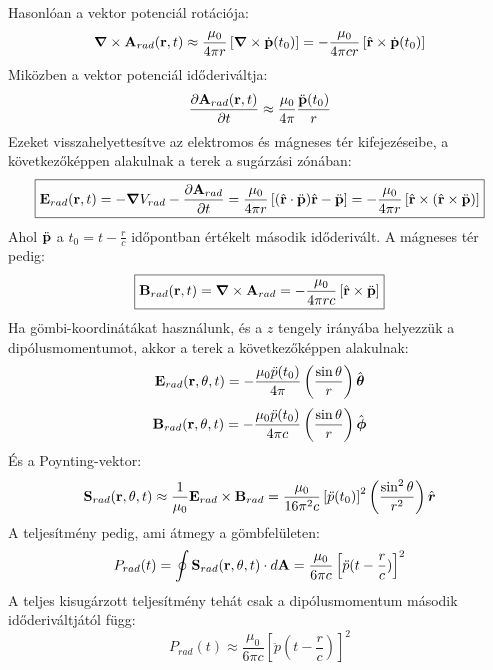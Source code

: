 \documentclass[a4paper,12pt]{article}
\begin{document}
Hasonlóan a vektor potenciál rotációja:
\begin{equation}
    \boldsymbol{\nabla} \times \bold{A}_{rad}(\bold{r}, t) \approx \frac{\mu_0}{4 \pi r} \left[\boldsymbol{\nabla} \times \dot{\bold{p}}(t_0) \right] = - \frac{\mu_0}{4 \pi c r} \left[\hat{\bold{r}} \times\dot{\bold{p}}(t_0) \right]
\end{equation}
Miközben a vektor potenciál időderiváltja:
\begin{equation}
    \frac{\partial \bold{A}_{rad}(\bold{r}, t)}{\partial t} \approx \frac{\mu_0}{4 \pi} \frac{\ddot{\bold{p}}(t_0)}{r}
\end{equation}
Ezeket visszahelyettesítve az elektromos és mágneses tér kifejezéseibe, a következőképpen alakulnak a terek a sugárzási zónában:
\begin{equation}
    \boxed{\bold{E}_{rad}(\bold{r}, t) = - \boldsymbol{\nabla} V_{rad} - \frac{\partial \bold{A}_{rad}}{\partial t} = \frac{\mu_0}{4 \pi r} \left[(\hat{\bold{r}} \cdot \ddot{\bold{p}})\hat{\bold{r}} - \ddot{\bold{p}}\right] = - \frac{\mu_0}{4 \pi r} \left[\hat{\bold{r}} \times (\hat{\bold{r}} \times \ddot{\bold{p}})\right]}
\end{equation}
Ahol $\ddot{\bold{p}}$ a $t_0 = t - \frac{r}{c}$ időpontban értékelt második időderivált. A mágneses tér pedig:
\begin{equation}
    \boxed{\bold{B}_{rad}(\bold{r}, t) = \boldsymbol{\nabla} \times \bold{A}_{rad} = - \frac{\mu_0}{4 \pi r c} \left[\hat{\bold{r}} \times \ddot{\bold{p}}\right]}
\end{equation}
Ha gömbi-koordinátákat használunk, és a $z$ tengely irányába helyezzük a dipólusmomentumot, akkor a terek a következőképpen alakulnak:
        \begin{equation}
            \bold{E}_{rad}(\bold{r}, \theta, t) = - \frac{\mu_0 \ddot{p}(t_0)}{4 \pi} \left(\frac{\sin \theta}{r}\right) \hat{\boldsymbol{\theta}}
\end{equation}
\begin{equation}
    \bold{B}_{rad}(\bold{r}, \theta, t) = - \frac{\mu_0 \ddot{p}(t_0)}{4 \pi c} \left(\frac{\sin \theta}{r}\right) \hat{\boldsymbol{\phi}}
\end{equation}
És a Poynting-vektor:
\begin{equation}
    \bold{S}_{rad}(\bold{r}, \theta, t) \approx \frac{1}{\mu_0} \bold{E}_{rad} \times \bold{B}_{rad} = \frac{\mu_0}{16 \pi^2 c} \left[\ddot{p}(t_0)\right]^2 \left(\frac{\sin^2 \theta}{r^2}\right) \hat{\boldsymbol{r}}
\end{equation}
A teljesítmény pedig, ami átmegy a gömbfelületen:
\begin{equation}
    P_{rad}(t) = \oint \bold{S}_{rad}(\bold{r}, \theta, t) \cdot d\bold{A} = \frac{\mu_0}{6 \pi c} \left[\ddot{p}(t - \frac{r}{c})\right]^2
\end{equation}
A teljes kisugárzott teljesítmény tehát csak a dipólusmomentum második időderiváltjától függ:
\begin{equation}
    P_{rad}(t) \approx \frac{\mu_0}{6 \pi c} \left[\ddot{p}(t - \frac{r}{c})\right]^2
\end{equation}
\end{document}
